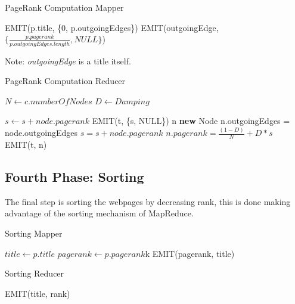 \begin{algorithm}
	\caption{PageRank Computation Mapper}\label{Mapper}
		\begin{algorithmic}[1]
			
			\State EMIT(p.title, \{0, p.outgoingEdges\})
			\State EMIT(outgoingEdge, $\{\frac{p.pagerank}{p.outgoingEdges.length}, NULL\}$)
			\EndFor
			\EndProcedure
	\end{algorithmic}
\end{algorithm}
Note: \textit{outgoingEdge} is a title itself.


\begin{algorithm}[H]
	\caption{PageRank Computation Reducer}\label{Reducer}
		\begin{algorithmic}[1]
				\State $N \gets c.numberOfNodes$
				\State $D \gets Damping$
			\EndProcedure
		
						\State $s \gets s + node.pagerank$	
					\EndFor
					\State EMIT(t, \{s, NULL\})
				\Else
					\State n \textbf{new} Node
							\State n.outgoingEdges = node.outgoingEdges
						\Else
							\State $s = s + node.pagerank$
						\EndIf
					\EndFor
					\State$n.pagerank =  \frac{(1-D)}{N} + D*s$
					\State EMIT(t, n)
				\EndIf
			\EndProcedure
	\end{algorithmic}
\end{algorithm}



\subsection{Fourth Phase: Sorting}
The final step is sorting the webpages by decreasing rank, this is done making advantage of the sorting mechanism of MapReduce.

\begin{algorithm}[H]
	\caption{Sorting Mapper}\label{Mapper}
	\begin{algorithmic}[1]
		\State $title \gets p.title$
		\State $pagerank \gets p.pagerank$k
		\State EMIT(pagerank, title)
		\EndProcedure
	\end{algorithmic}
\end{algorithm}

\begin{algorithm}[H]
	\caption{Sorting Reducer}\label{Reducer}
	\begin{algorithmic}[1]
		\State EMIT(title, rank)
		\EndFor
		\EndProcedure
	\end{algorithmic}
\end{algorithm}
